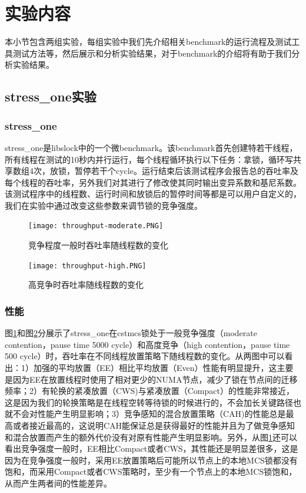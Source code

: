 \section{实验内容}
本小节包含两组实验，每组实验中我们先介绍相关benchmark的运行流程及测试工具测试方法等，然后展示和分析实验结果，对于benchmark的介绍将有助于我们分析实验结果。
\subsection{stress\_one实验}
\subsubsection{stress\_one}
stress\_one是libslock\cite{david2013everything}中的一个微benchmark。该benchmark首先创建特若干线程，所有线程在测试的10秒内并行运行，每个线程循环执行以下任务：拿锁，循环写共享数组4次，放锁，暂停若干个cycle。运行结束后该测试程序会报告总的吞吐率及每个线程的吞吐率，另外我们对其进行了修改使其同时输出变异系数和基尼系数。该测试程序中的线程数、运行时间和放锁后的暂停时间等都是可以用户自定义的，我们在实验中通过改变这些参数来调节锁的竞争强度。

\begin{figure}[t]
	\centering
	\texttt{[image: throughput-moderate.PNG]}
	\caption{竞争程度一般时吞吐率随线程数的变化}
	\label{Fig:throughput-moderate}
\end{figure}

\begin{figure}[t]
	\centering
	\texttt{[image: throughput-high.PNG]}
	\caption{高竞争时吞吐率随线程数的变化}
	\label{Fig:throughput-high}
\end{figure}

\subsubsection{性能}
图\ref{Fig:throughput-moderate}和图\ref{Fig:throughput-high}分展示了stress\_one在cstmcs锁处于一般竞争强度（moderate contention，pause time 5000 cycle）和高度竞争（high contention，pause time 500 cycle）时，吞吐率在不同线程放置策略下随线程数的变化。从两图中可以看出：1）加强的平均放置（EE）相比平均放置（Even）性能有明显提升，这主要是因为EE在放置线程时使用了相对更少的NUMA节点，减少了锁在节点间的迁移频率；2）有轮换的紧凑放置（CWS)与紧凑放置（Compact）的性能非常接近，这是因为我们的轮换策略是在线程空转等待锁的时候进行的，不会加长关键路径也就不会对性能产生明显影响；3）竞争感知的混合放置策略（CAH)的性能总是最高或者接近最高的，这说明CAH能保证总是获得最好的性能并且为了做竞争感知和混合放置而产生的额外代价没有对原有性能产生明显影响。另外，从图\ref{Fig:throughput-moderate}还可以看出竞争强度一般时，EE相比Compact或者CWS，其性能还是明显差很多，这是因为在竞争强度一般时，采用EE放置策略后可能所以节点上的本地MCS锁都没有饱和，而采用Compact或者CWS策略时，至少有一个节点上的本地MCS锁饱和，从而产生两者间的性能差异。

